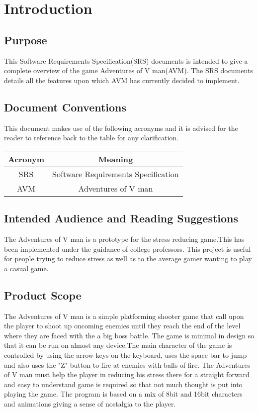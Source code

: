 \chapter{Introduction}
\label{ch:intro}

\section{Purpose}
This Software Requirements Specification(SRS) documents is intended to give a complete overview of the game Adventures of V man(AVM). The SRS documents details all the features upon which AVM has currently decided to implement.  
\section{Document Conventions}
This document makes use of the following acronyms and it is advised for the reader to reference back to the table for any clarification. 

\begin{center}
 \begin{tabular}{||c c||} 
 \hline
 Acronym & Meaning \\ [0.5ex] 
 \hline\hline
 SRS & Software Requirements Specification \\ 
 \hline
 AVM & Adventures of V man  \\
 \hline
\end{tabular}
\end{center}




\section{Intended Audience and Reading Suggestions}
The Adventures of V man is a prototype for the stress reducing game.This has been implemented under the guidance of college professors. This project is useful for people trying to reduce stress as well as to the average gamer wanting to play a casual game.


\section{Product Scope}
The Adventures of V man is a simple platforming shooter game that call upon the player to shoot up oncoming enemies until they reach the end of the level where they are faced with the a big boss battle.
The game is minimal in design so that it can be run on almost any device.The main character of the game is controlled by using the arrow keys on the keyboard, uses the space bar to jump and also uses the "Z" button to fire at enemies with balls of fire.
The Adventures of V man must help the player in reducing his stress there for a straight forward and easy to understand game is required so that not much thought is put into playing the game. The program is based on a mix of 8bit and 16bit characters and animations giving a sense of nostalgia to the player.

